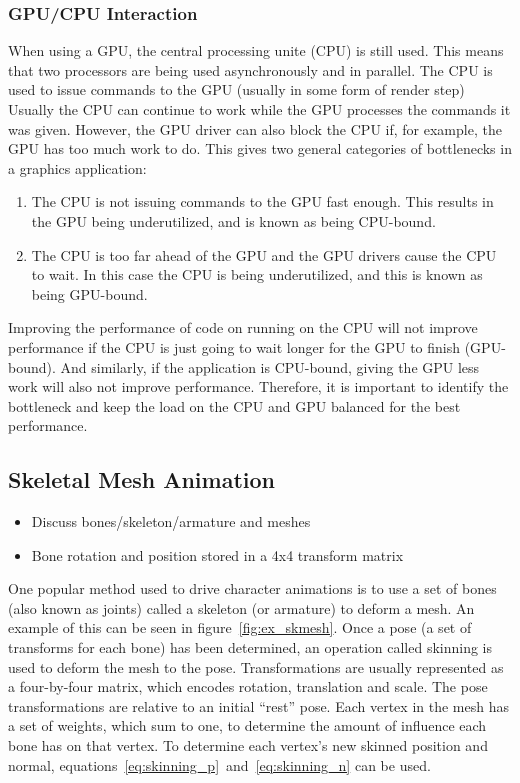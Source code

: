 \subsubsection{GPU/CPU Interaction}
When using a GPU, the central processing unite (CPU) is still used.
This means that two processors are being used asynchronously and in parallel.
The CPU is used to issue commands to the GPU (usually in some form of render step)
Usually the CPU can continue to work while the GPU processes the commands it was given.
However, the GPU driver can also block the CPU if, for example, the GPU has too much work to do.
This gives two general categories of bottlenecks in a graphics application:
\begin{enumerate}
 \item The CPU is not issuing commands to the GPU fast enough. This results in the GPU being underutilized, and is known as being CPU-bound.
 \item The CPU is too far ahead of the GPU and the GPU drivers cause the CPU to wait. In this case the CPU is being underutilized, and this is known as being GPU-bound.
\end{enumerate}
Improving the performance of code on running on the CPU will not improve performance if the CPU is just going to wait longer for the GPU to finish (GPU-bound).
And similarly, if the application is CPU-bound, giving the GPU less work will also not improve performance.
Therefore, it is important to identify the bottleneck and keep the load on the CPU and GPU balanced for the best performance.

\subsection{Skeletal Mesh Animation}
\ifsummaries
\begin{itemize}
 \item Discuss bones/skeleton/armature and meshes
 \item Bone rotation and position stored in a 4x4 transform matrix
\end{itemize}
\fi

One popular method used to drive character animations is to use a set of bones (also known as joints) called a skeleton (or armature) to deform a mesh.
An example of this can be seen in figure~\ref{fig:ex_skmesh}.
Once a pose (a set of transforms for each bone) has been determined, an operation called skinning is used to deform the mesh to the pose.
Transformations are usually represented as a four-by-four matrix, which encodes rotation, translation and scale.
The pose transformations are relative to an initial ``rest'' pose.
Each vertex in the mesh has a set of weights, which sum to one, to determine the amount of influence each bone has on that vertex.
To determine each vertex's new skinned position and normal, equations~\ref{eq:skinning_p}~and~\ref{eq:skinning_n} can be used.

